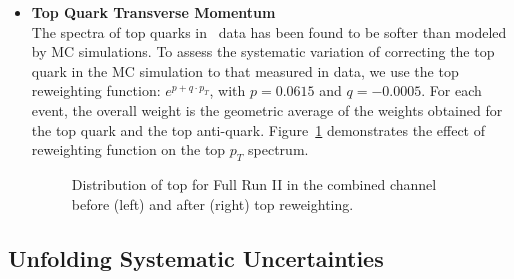 \begin{itemize}
    \item {\bf Top Quark Transverse Momentum} \\
    The \pT spectra of top quarks in \ttbar\ data has been found to be softer than modeled by MC simulations.
    To assess the systematic variation of correcting the top quark \pT in the MC simulation to that measured in data, we use the \beamenergy top \pT reweighting function: $e^{p+q \cdot p_T}$, with $p = 0.0615$ and $q = -0.0005$.
    For each event, the overall weight is the geometric average of the weights obtained for the top quark and the top anti-quark.
    Figure~\ref{fig:fullRun2ULtopptreweighting} demonstrates the effect of reweighting function on the top $p_T$ spectrum.
    \begin{figure}
      \begin{center}
      \end{center}
      \caption{\small Distribution of top \pT for Full Run II in the combined channel before (left) and after (right) top \pT reweighting.}      
      \label{fig:fullRun2ULtopptreweighting}
    \end{figure}
\end{itemize}

\subsection{Unfolding Systematic Uncertainties}














